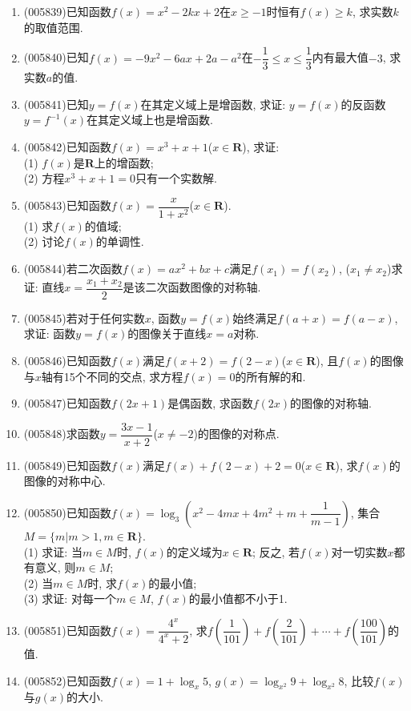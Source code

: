 \documentclass[10pt,a4paper]{article}
\begin{document}
\begin{enumerate}[1.]
\item {\tiny (005839)}已知函数$f(x)=x^2-2kx+2$在$x\ge -1$时恒有$f(x)\ge k$, 求实数$k$的取值范围.
\item {\tiny (005840)}已知$f(x)=-9x^2-6ax+2a-a^2$在$-\dfrac 13\le x\le \dfrac 13$内有最大值$-3$, 求实数$a$的值.
\item {\tiny (005841)}已知$y=f(x)$在其定义域上是增函数, 求证: $y=f(x)$的反函数$y=f^{-1}(x)$在其定义域上也是增函数.
\item {\tiny (005842)}已知函数$f(x)=x^3+x+1$($x\in \mathbf{R}$), 求证:\\
(1) $f(x)$是$\mathbf{R}$上的增函数;\\
(2) 方程$x^3+x+1=0$只有一个实数解.
\item {\tiny (005843)}已知函数$f(x)=\dfrac x{1+x^2}$($x\in \mathbf{R}$).\\
(1) 求$f(x)$的值域;\\
(2) 讨论$f(x)$的单调性.
\item {\tiny (005844)}若二次函数$f(x)=ax^2+bx+c$满足$f(x_1)=f(x_2)$, ($x_1\ne x_2$)求证: 直线$x=\dfrac{x_1+x_2}2$是该二次函数图像的对称轴.
\item {\tiny (005845)}若对于任何实数$x$, 函数$y=f(x)$始终满足$f(a+x)=f(a-x)$, 求证: 函数$y=f(x)$的图像关于直线$x=a$对称.
\item {\tiny (005846)}已知函数$f(x)$满足$f(x+2)=f(2-x)$($x\in \mathbf{R}$), 且$f(x)$的图像与$x$轴有15个不同的交点, 求方程$f(x)=0$的所有解的和.
\item {\tiny (005847)}已知函数$f(2x+1)$是偶函数, 求函数$f(2x)$的图像的对称轴.
\item {\tiny (005848)}求函数$y=\dfrac{3x-1}{x+2}$($x\ne -2$)的图像的对称点.
\item {\tiny (005849)}已知函数$f(x)$满足$f(x)+f(2-x)+2=0$($x\in \mathbf{R}$), 求$f(x)$的图像的对称中心.
\item {\tiny (005850)}已知函数$f(x)=\log_3(x^2-4mx+4m^2+m+\dfrac 1{m-1})$, 集合$M=\{m|m>1,m\in \mathbf{R}\}$.\\
(1) 求证: 当$m\in M$时, $f(x)$的定义域为$x\in \mathbf{R}$; 反之, 若$f(x)$对一切实数$x$都有意义, 则$m\in M$;\\
(2) 当$m\in M$时, 求$f(x)$的最小值;\\
(3) 求证: 对每一个$m\in M$, $f(x)$的最小值都不小于1.
\item {\tiny (005851)}已知函数$f(x)=\dfrac{4^x}{4^x+2}$, 求$f(\dfrac 1{101})+f(\dfrac 2{101})+\cdots +f(\dfrac{100}{101})$的值.
\item {\tiny (005852)}已知函数$f(x)=1+\log_x5$, $g(x)=\log_{x^2}9+\log_{x^2}8$, 比较$f(x)$与$g(x)$的大小.

\end{enumerate}
\end{document}
